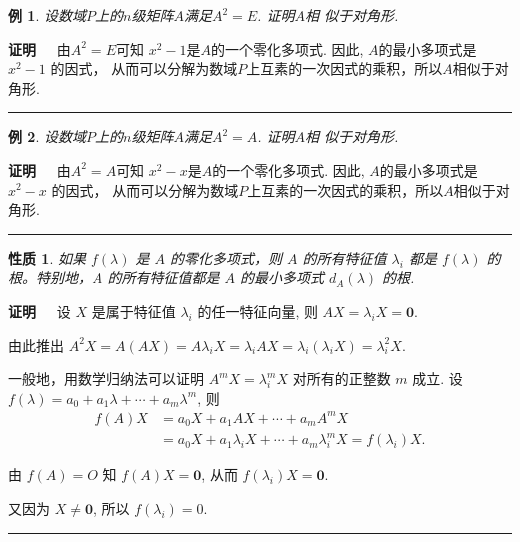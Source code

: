 \documentclass[13pt]{beamer}
\newtheorem{exa}{例}
\newtheorem*{prop}{性质}
\def\qed{\nopagebreak\hfill{\rule{4pt}{7pt}}\medbreak}
\def\pf{{\bf 证明~~ }}
\def\0{\mathbf{0}}
\begin{document}
\begin{frame}
\begin{exa}
设数域$P$上的$n$级矩阵$A$满足$A^2=E$. 证明$A$相
似于对角形. 
\end{exa} 
\pf 由$A^2=E$可知 $x^2-1$是$A$的一个零化多项式. 
因此, $A$的最小多项式是$x^2-1$ 的因式，
从而可以分解为数域$P$上互素的一次因式的乘积，所以$A$相似于对角形. 
\qed

\begin{exa}
	设数域$P$上的$n$级矩阵$A$满足$A^{2}=A$. 证明$A$相
	似于对角形. 
\end{exa} 
\pf 
由$A^{2}=A$可知 $x^2-x$是$A$的一个零化多项式. 
因此, $A$的最小多项式是$x^2-x$ 的因式，
从而可以分解为数域$P$上互素的一次因式的乘积，所以$A$相似于对角形. 
\qed
\end{frame}


\begin{frame}

\begin{prop}
如果 $f(\lambda)$ 是 $A$ 的零化多项式，则 $A$ 的所有特征值 $\lambda_{i}$ 都是
$f(\lambda)$ 的根。特别地，A 的所有特征值都是 $A$ 的最小多项式 $d_{A}(\lambda)$ 的根.
\end{prop}

\pf 设 $X$ 是属于特征值 $\lambda_{i}$ 的任一特征向量, 则 $A X=\lambda_{i} X=\0 .$ 

由此推出
$
A^{2} X=A(A X)=A \lambda_{i} X=\lambda_{i} A X=\lambda_{i}\left(\lambda_{i} X\right)=\lambda_{i}^{2} X.
$

一般地，用数学归纳法可以证明 $A^{m} X=\lambda_{i}^{m} X$ 对所有的正整数 $m$ 成立.
设
$
f(\lambda)=a_{0}+a_{1} \lambda+\cdots+a_{m} \lambda^{m}$,  { 则 } 
\begin{align*}
f({A}) {X} &=a_{0} {X}+a_{1} A {X}+\cdots+a_{m} {A}^{m} {X} \\
&=a_{0} {X}+a_{1} \lambda_{i} {X}+\cdots+a_{m} \lambda_{i}^{m} {X}=f\left(\lambda_{i}\right) X.
\end{align*}

由  $f({A})={O}$  知 
$f(A) X=\0$, 
 从而  $f\left(\lambda_{i}\right) X=\0$.
 
又因为 $X \neq \0$,  { 所以 } $f\left(\lambda_{i}\right)= 0$.
 \qed
\end{frame}

\setcounter{exa}{0}
\end{document}
